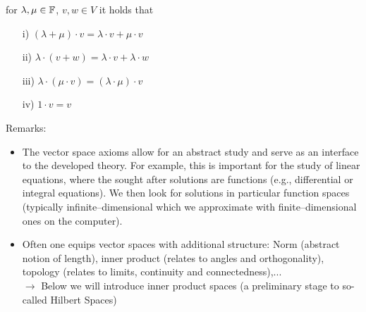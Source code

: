 \begin{frame}[c]
\begin{definition}
\begin{itemize}
	for $\lambda,\mu \in {\mathbb{F}}$, $v,w \in V$ it holds that  
	\begin{itemize} \normalsize
		\item[i)] $(\lambda + \mu)\cdot v = \lambda \cdot v + \mu \cdot v$ 
		\item[ii)] $\lambda \cdot (v+w) = \lambda \cdot v + \lambda \cdot w$ 
		\item[iii)] $\lambda \cdot (\mu \cdot v) = (\lambda \cdot \mu) \cdot v$  
		\item[iv)] $1 \cdot v = v$ 
	\end{itemize} 
\end{itemize}
\end{definition}
Remarks:
\begin{itemize}
	\item The vector space axioms allow for an abstract study and serve as an interface to the developed theory. For example, this is important for the study of linear equations, where the sought after solutions are functions (e.g., differential or integral equations). We then look for solutions in particular function spaces (typically infinite--dimensional which we approximate with finite--dimensional ones on the computer).
	\item Often one equips vector spaces with additional structure: Norm (abstract notion of length), inner product (relates to angles and orthogonality), topology (relates to limits, continuity and connectedness),...\\
	$\rightarrow$ Below we will introduce inner product spaces (a preliminary stage to so-called Hilbert Spaces)
\end{itemize}
\end{frame}


